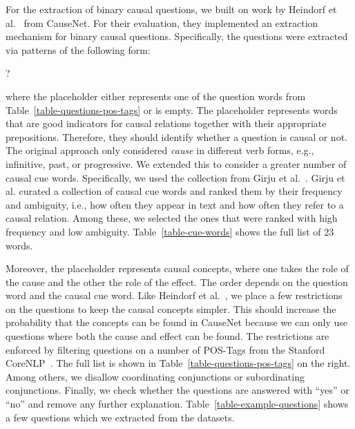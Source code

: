 \newcommand{\pattern}[1]{\texttt{\fontsize{9.5pt}{10pt}\selectfont [#1]}\xspace}
For the extraction of binary causal questions, we built on work by 
Heindorf et al.~\cite{Heindorf2020Causenet} from CauseNet.
For their evaluation, they implemented an extraction mechanism for binary causal questions.
Specifically, the questions were extracted via patterns of the following form:
\begin{center}
\texttt{\xspace}
\texttt{\xspace}
\texttt{\xspace}
\texttt{\xspace} ?
\end{center}
where the \texttt{\xspace} placeholder either represents one of the question words from 
Table~\ref{table-questions-pos-tags} or is empty. The \texttt{\xspace} placeholder 
represents words that are good indicators for causal relations together with their appropriate prepositions. Therefore, they should 
identify whether a question is causal or not. The original approach
only considered \textit{cause} in different verb forms, e.g., infinitive, past, or progressive.
We extended this to consider a greater number of causal cue words.
Specifically, we used the collection from Girju et al.~\cite{Girju2002CausalCue}.
Girju et al. curated a collection of causal cue words and ranked them by their 
frequency and ambiguity, i.e., how often they appear in text and how often they 
refer to a causal relation. 
Among these, we selected the ones that were ranked with high frequency and low 
ambiguity.
Table~\ref{table-cue-words} shows the full list of 23 words. 

Moreover, the \texttt{\xspace} placeholder 
represents causal concepts, where one takes the role of the cause and the other 
the role of the effect. The order depends on the question word and the causal cue word. Like
 Heindorf et al.~\cite{Heindorf2020Causenet}, we place a few restrictions 
on the questions to keep the causal concepts simpler. This should increase 
the probability that the concepts can be found in CauseNet because we can only 
use questions where both the cause and effect can be found. The restrictions are 
enforced by filtering questions on a number of POS-Tags from the Stanford CoreNLP~\cite{Manning2014NLP}.
The full list is shown in Table~\ref{table-questions-pos-tags} on the right.
Among others, we disallow coordinating conjunctions or subordinating conjunctions.
Finally, we check whether the questions are answered with ``yes'' or ``no'' and remove 
any further explanation. Table~\ref{table-example-questions} shows a few questions which 
we extracted from the datasets.

